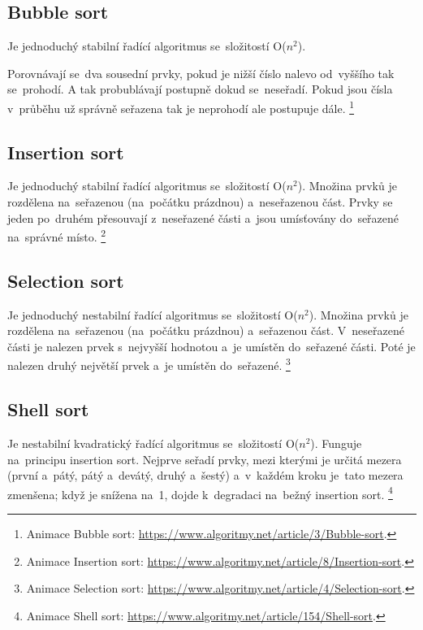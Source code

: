 \subsection{Bubble sort}

Je jednoduchý stabilní řadící algoritmus se~složitostí O($n^2$).

Porovnávají se~dva sousední prvky, pokud je nižší číslo nalevo od~vyššího tak se~prohodí. A tak probublávají postupně dokud se~neseřadí. Pokud jsou čísla v~průběhu už správně seřazena tak je neprohodí ale postupuje dále.%
\footnote{Animace Bubble sort: \url{https://www.algoritmy.net/article/3/Bubble-sort}.}

\subsection{Insertion sort}

Je jednoduchý stabilní řadící algoritmus se~složitostí O($n^2$). Množina prvků je rozdělena na~seřazenou (na~počátku prázdnou) a~neseřazenou část. Prvky se jeden po~druhém přesouvají z~neseřazené části a~jsou umísťovány do~seřazené na~správné místo.%
\footnote{Animace Insertion sort: \url{https://www.algoritmy.net/article/8/Insertion-sort}.}

\subsection{Selection sort}

Je jednoduchý nestabilní řadící algoritmus se~složitostí O($n^2$). Množina prvků je rozdělena na~seřazenou (na~počátku prázdnou) a~seřazenou část. V~neseřazené části je nalezen prvek s~nejvyšší hodnotou a~je umístěn do~seřazené části. Poté je nalezen druhý největší prvek a~je umístěn do~seřazené.%
\footnote{Animace Selection sort: \url{https://www.algoritmy.net/article/4/Selection-sort}.}

\subsection{Shell sort}

Je nestabilní kvadratický řadící algoritmus se~složitostí O($n^2$). Funguje na~principu insertion sort. Nejprve seřadí prvky, mezi kterými je určitá mezera (první a~pátý, pátý a~devátý, druhý a~šestý) a~v~každém kroku je~tato mezera zmenšena; když je snížena na~1, dojde k~degradaci na~bežný insertion sort.%
\footnote{Animace Shell sort: \url{https://www.algoritmy.net/article/154/Shell-sort}.}


